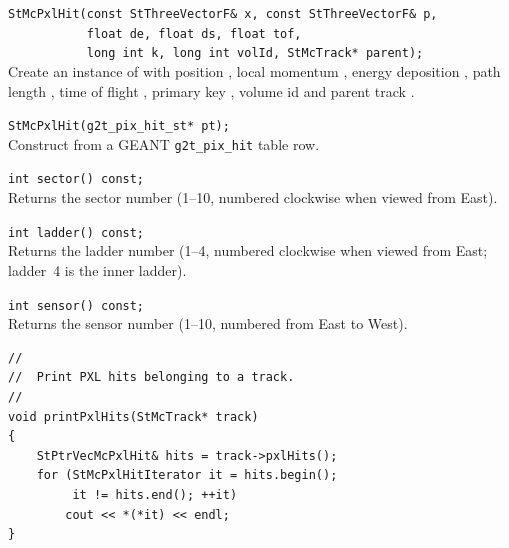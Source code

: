\begin{Entry}
    \verb+StMcPxlHit(const StThreeVectorF& x, const StThreeVectorF& p,+\\
    \verb+           float de, float ds, float tof,+\\
    \verb+           long int k, long int volId, StMcTrack* parent);+\\
    Create an instance of  with position ,
    local momentum , energy deposition , path length
    , time of flight , primary key ,
    volume id  and parent track .

    \verb+StMcPxlHit(g2t_pix_hit_st* pt);+\\
    Construct from a GEANT \texttt{g2t\_pix\_hit} table row.

\item[Public Member\\ Functions]

    \verb+int sector() const;+\\
    Returns the sector number (1--10, numbered clockwise when viewed
    from East).

    \verb+int ladder() const;+\\
    Returns the ladder number (1--4, numbered clockwise when viewed from
    East; ladder~4 is the inner ladder).

    \verb+int sensor() const;+\\
    Returns the sensor number (1--10, numbered from East to West).

\item[Examples]
{\footnotesize
\begin{verbatim}
//
//  Print PXL hits belonging to a track.
//
void printPxlHits(StMcTrack* track)
{
    StPtrVecMcPxlHit& hits = track->pxlHits();
    for (StMcPxlHitIterator it = hits.begin();
         it != hits.end(); ++it)
        cout << *(*it) << endl;
}
\end{verbatim}
}%
\end{Entry}
\clearpage

%
%
